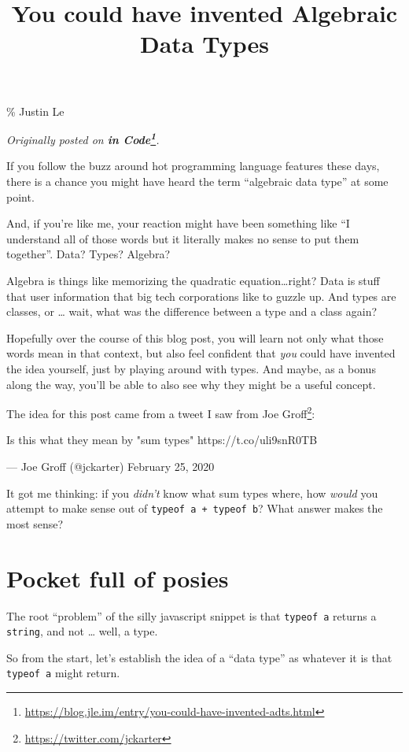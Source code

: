 \documentclass[]{article}
\title{You could have invented Algebraic Data Types}
\renewcommand{\href}[2]{#2\footnote{\url{#1}}}
\begin{document}
\maketitle

\% Justin Le

\emph{Originally posted on
\textbf{\href{https://blog.jle.im/entry/you-could-have-invented-adts.html}{in
Code}}.}

If you follow the buzz around hot programming language features these days,
there is a chance you might have heard the term ``algebraic data type'' at some
point.

And, if you're like me, your reaction might have been something like ``I
understand all of those words but it literally makes no sense to put them
together''. Data? Types? Algebra?

Algebra is things like memorizing the quadratic equation\ldots right? Data is
stuff that user information that big tech corporations like to guzzle up. And
types are classes, or \ldots{} wait, what was the difference between a type and
a class again?

Hopefully over the course of this blog post, you will learn not only what those
words mean in that context, but also feel confident that \emph{you} could have
invented the idea yourself, just by playing around with types. And maybe, as a
bonus along the way, you'll be able to also see why they might be a useful
concept.

The idea for this post came from a tweet I saw from
\href{https://twitter.com/jckarter}{Joe Groff}:

Is this what they mean by "sum types" https://t.co/uli9snR0TB

--- Joe Groff (@jckarter) February 25, 2020

It got me thinking: if you \emph{didn't} know what sum types where, how
\emph{would} you attempt to make sense out of \texttt{typeof\ a\ +\ typeof\ b}?
What answer makes the most sense?

\section{Pocket full of posies}\label{pocket-full-of-posies}

The root ``problem'' of the silly javascript snippet is that \texttt{typeof\ a}
returns a \texttt{string}, and not \ldots{} well, a type.

So from the start, let's establish the idea of a ``data type'' as whatever it is
that \texttt{typeof\ a} might return.
\end{document}
